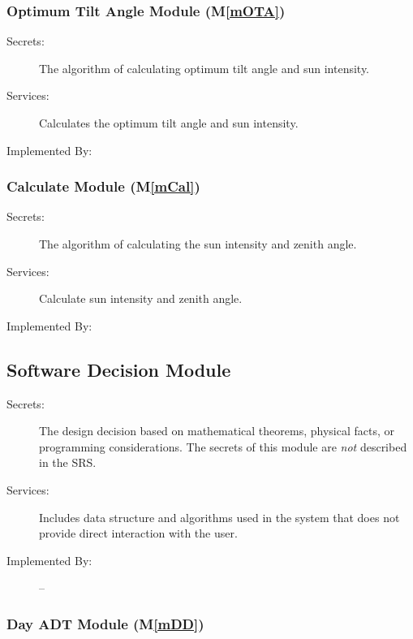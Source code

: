 \documentclass[12pt, titlepage]{article}
\newcommand{\mref}[1]{M\ref{#1}}
\begin{document}
\subsubsection{Optimum Tilt Angle Module (\mref{mOTA})}

\begin{description}
\item[Secrets:]The algorithm of calculating optimum tilt angle and sun intensity.
\item[Services:] Calculates the optimum tilt angle and sun intensity.
\item[Implemented By:] \progname
\end{description}

\subsubsection{Calculate Module (\mref{mCal})}

\begin{description}
\item[Secrets:]The algorithm of calculating the sun intensity and zenith angle.
\item[Services:] Calculate sun intensity and zenith angle.
\item[Implemented By:] \progname

\end{description}


\subsection{Software Decision Module}

\begin{description}
\item[Secrets:] The design decision based on mathematical theorems, physical
  facts, or programming considerations. The secrets of this module are
  \emph{not} described in the SRS.
\item[Services:] Includes data structure and algorithms used in the system that
  does not provide direct interaction with the user. 
\item[Implemented By:] --
\end{description}


\subsubsection{Day ADT Module (\mref{mDD})}
\end{document}
